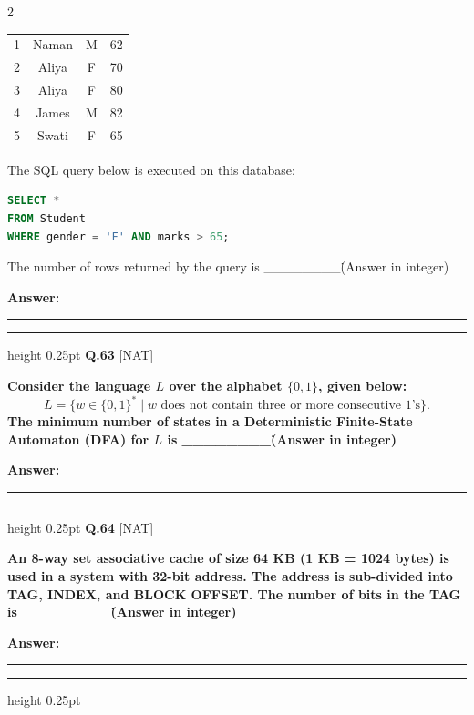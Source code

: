 \documentclass[a4paper,10pt,twoside]{article}
\begin{document}
\begin{multicols}{2}
{\begin{center}
\begin{tabular}{|c|c|c|c|}
\hline
1 & Naman & M & 62 \\
2 & Aliya & F & 70 \\
3 & Aliya & F & 80 \\
4 & James & M & 82 \\
5 & Swati & F & 65 \\
\hline
\end{tabular}
\end{center}
The SQL query below is executed on this database:
\begin{lstlisting}[language=SQL]
SELECT *
FROM Student
WHERE gender = 'F' AND marks > 65;
\end{lstlisting}
The number of rows returned by the query is \_\_\_\_\_\_\_\_\. (Answer in integer) \par}
\par\vspace{3pt}\noindent\textbf{Answer:} \rule{3.2cm}{0.4pt}
\par\vspace{6pt}\hrule height 0.25pt\vspace{6pt}
\noindent\textbf{Q.63} \hfill {\footnotesize\textsf{[NAT]}}
\par\vspace{2pt}
{\bfseries Consider the language $L$ over the alphabet $\{0, 1\}$, given below:
\[ L = \{w \in \{0, 1\}^* \mid w \text{ does not contain three or more consecutive 1's}\}. \]
The minimum number of states in a Deterministic Finite-State Automaton (DFA) for $L$ is \_\_\_\_\_\_\_\_\. (Answer in integer) \par}
\par\vspace{3pt}\noindent\textbf{Answer:} \rule{3.2cm}{0.4pt}
\par\vspace{6pt}\hrule height 0.25pt\vspace{6pt}
\noindent\textbf{Q.64} \hfill {\footnotesize\textsf{[NAT]}}
\par\vspace{2pt}
{\bfseries An 8-way set associative cache of size 64 KB (1 KB = 1024 bytes) is used in a system with 32-bit address. The address is sub-divided into TAG, INDEX, and BLOCK OFFSET.
The number of bits in the TAG is \_\_\_\_\_\_\_\_\. (Answer in integer) \par}
\par\vspace{3pt}\noindent\textbf{Answer:} \rule{3.2cm}{0.4pt}
\par\vspace{6pt}\hrule height 0.25pt\vspace{6pt}

\end{multicols}
\end{document}

